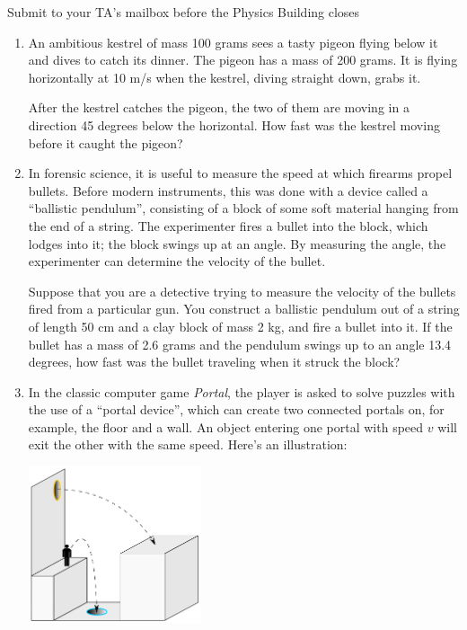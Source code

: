 \documentclass[12pt]{article}
\begin{document}
\Large
\centerline{}
\normalsize
\centerline{}
\centerline{Submit to your TA's mailbox before the Physics Building closes}

\begin{enumerate}

\item{An ambitious kestrel of mass 100 grams sees a tasty pigeon flying below it and dives to catch its dinner. The pigeon has a mass of 200 grams. It is flying horizontally at
10 m/s when the kestrel, diving straight down, grabs it.

After the kestrel catches the pigeon, the two of them are moving in a direction 45 degrees below the horizontal. How fast was the kestrel moving before it caught the pigeon?}

\item{In forensic science, it is useful to measure the speed at which firearms propel bullets. Before modern instruments, this was done with a device called a ``ballistic pendulum'', consisting of a block of some soft material hanging from the end of a string.
The experimenter fires a bullet into the block, which lodges into it; the block swings up at an angle. By measuring the angle, the experimenter can determine the velocity of the bullet.

Suppose that you are a detective trying to measure the velocity of the bullets fired from a particular gun. You construct a ballistic pendulum out of a string of length 50 cm and a clay block of mass 2 kg, and fire a bullet into it. If the bullet has
a mass of 2.6 grams and the pendulum swings up to an angle 13.4 degrees, how fast was the bullet traveling when it struck the block?}

\item{In the classic computer game {\it Portal}, the player is asked to solve
puzzles with the use of a ``portal device'', which can create two connected portals
on, for example, the floor and a wall. An object entering one portal with speed $v$
will exit the other with the same speed. Here's an illustration:

\includegraphics[width=0.4\textwidth]{Portal_physics-2.png}

}
\end{enumerate}
\end{document}
